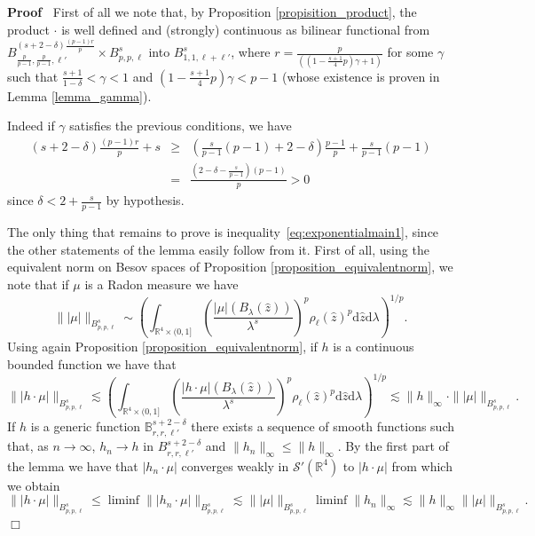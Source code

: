 \documentclass[a4paper,10pt]{article}
\newcommand{\mathd}{\mathrm{d}}
\newenvironment{proof}{\noindent\textbf{Proof\ }}{\hspace*{\fill}$\Box$\medskip}
\begin{document}
\begin{proof}
  First of all we note that, by Proposition \ref{propisition_product}, the
  product $\cdot$ is well defined and (strongly) continuous as bilinear
  functional from $B^{(s + 2 - \delta) \frac{(p - 1) r}{p}}_{\frac{p}{p - 1},
  \frac{p}{p - 1}, \ell'} \times B^s_{p, p, \ell}$ into $B^s_{1, 1, \ell +
  \ell'}$, where $r = \frac{p}{\left( \left( 1 - \frac{s + 1}{4} p \right)
  \gamma + 1 \right)}$ for some $\gamma$ such that $\frac{s + 1}{1 - \delta} <
  \gamma < 1$ and $\left( 1 - \frac{s + 1}{4} p \right) \gamma < p - 1$ (whose
  existence is proven in Lemma \ref{lemma_gamma}).
  
  Indeed if $\gamma$ satisfies the previous conditions, we have
  \begin{eqnarray}
    (s + 2 - \delta) \frac{(p - 1) r}{p} + s & \geq & \left( \frac{s}{p - 1}
    (p - 1) + 2 - \delta \right) \frac{p - 1}{p} + \frac{s}{p - 1} (p - 1)
    \nonumber\\
    & = & \frac{\left( 2 - \delta - \frac{s}{p - 1} \right) (p - 1)}{p} > 0
    \nonumber
  \end{eqnarray}
  since $\delta < 2 + \frac{s}{p - 1}$ by hypothesis.
  
  The only thing that remains to prove is
  inequality~{\eqref{eq:exponentialmain1}}, since the other statements of the
  lemma easily follow from it. First of all, using the equivalent norm on
  Besov spaces of Proposition \ref{proposition_equivalentnorm}, we note that
  if $\mu$ is a Radon measure we have
  \[ \| | \mu | \|_{B^s_{p, p, \ell}} \sim \left( \int_{\mathbb{R}^4 \times
     (0, 1]} \left( \frac{| \mu | (B_{\lambda} (\hat{z}))}{\lambda^s}
     \right)^p \rho_{\ell} (\hat{z})^p \mathd \hat{z} \mathd \lambda
     \right)^{1 / p} . \]
  Using again Proposition \ref{proposition_equivalentnorm}, if $h$ is a
  continuous bounded function we have that
  \[ \| | h \cdot \mu | \|_{B^s_{p, p, \ell}} \lesssim \left(
     \int_{\mathbb{R}^4 \times (0, 1]} \left( \frac{| h \cdot \mu |
     (B_{\lambda} (\hat{z}))}{\lambda^s} \right)^p \rho_{\ell} (\hat{z})^p
     \mathd \hat{z} \mathd \lambda \right)^{1 / p} \lesssim \| h \|_{\infty}
     \cdot \| | \mu | \|_{B^s_{p, p, \ell}} . \]
  If $h$ is a generic function $\mathbb{B}^{s + 2 - \delta}_{r, r, \ell'}$
  there exists a sequence of smooth functions such that, as $n \rightarrow
  \infty$, $h_n \rightarrow h$ in $B^{s + 2 - \delta}_{r, r, \ell'}$ and $\|
  h_n \|_{\infty} \leqslant \| h \|_{\infty}$. By the first part of the lemma
  we have that $| h_n \cdot \mu |$ converges weakly in $\mathcal{S}'
  (\mathbb{R}^4)$ to $| h \cdot \mu |$ from which we obtain
  \[ \| | h \cdot \mu | \|_{B^s_{p, p, \ell}} \leqslant \liminf \| | h_n \cdot
     \mu | \|_{B^s_{p, p, \ell}} \lesssim \| | \mu | \|_{B^s_{p, p, \ell}}
     \liminf \| h_n \|_{\infty} \lesssim \| h \|_{\infty} \| | \mu |
     \|_{B^s_{p, p, \ell}} . \]
\end{proof}
\end{document}
